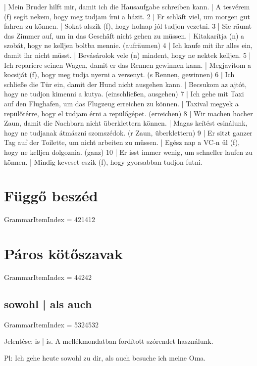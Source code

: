 \documentclass{article}
\newenvironment{desc}{\verbatim}{\endverbatim}
\newenvironment{exmp}{\verbatim}{\endverbatim}
\begin{document}
\begin{exmp}
1 | Mein Bruder hilft mir, damit ich die Hausaufgabe schreiben kann. | A tesvérem (f) segít nekem, hogy meg tudjam írni a házit.
2 | Er schläft viel, um morgen gut fahren zu können. | Sokat alszik (f), hogy holnap jól tudjon vezetni.
3 | Sie räumt das Zimmer auf, um in das Geschäft nicht gehen zu müssen. | Kitakarítja (n) a szobát, hogy ne kelljen boltba mennie. (aufräumen)
4 | Ich kaufe mit ihr alles ein, damit ihr nicht müsst. | Bevásárolok vele (n) mindent, hogy ne nektek kelljen.
5 | Ich repariere seinen Wagen, damit er das Rennen gewinnen kann. | Megjavítom a kocsiját (f), hogy meg tudja nyerni a versenyt. (s Rennen, gewinnen)
6 | Ich schließe die Tür ein, damit der Hund nicht ausgehen kann. | Becsukom az ajtót, hogy ne tudjon kimenni a kutya. (einschließen, ausgehen)
7 | Ich gehe mit Taxi auf den Flughafen, um das Flugzeug erreichen zu können. | Taxival megyek a repülőtérre, hogy el tudjam érni a repülőgépet. (erreichen)
8 | Wir machen hocher Zaun, damit die Nachbarn nicht überklettern können. | Magas keítést csinálunk, hogy ne tudjanak átmászni szomszédok. (r Zaun, überklettern)
9 | Er sitzt ganzer Tag auf der Toilette, um nicht arbeiten zu müssen. | Egész nap a VC-n ül (f), hogy ne kelljen dolgoznia. (ganz)
10 | Er isst immer wenig, um schneller laufen zu können. | Mindig keveset eszik (f), hogy gyorsabban tudjon futni.
\end{exmp}

\section{Függő beszéd}

GrammarItemIndex = 421412

\section{Páros kötőszavak}

GrammarItemIndex = 44242

\subsection{sowohl | als auch}

GrammarItemIndex = 5324532

\begin{desc}
Jelentése: is | is. A mellékmondatban fordított szórendet használunk.

Pl: Ich gehe heute sowohl zu dir, als auch besuche ich meine Oma. 
\end{desc}
\end{document}
